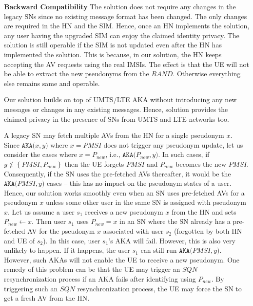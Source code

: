 \documentclass{llncs} %
\begin{document}
\textbf{Backward Compatibility} The solution does not require any changes in the legacy SNs since no existing message format has been changed. The only changes are required in the HN and the SIM. Hence, once an HN implements the solution, any user having the upgraded SIM can enjoy the claimed identity privacy. The solution is still operable if the SIM is not updated even after the HN has implemented the solution. This is because, in our solution, the HN keeps accepting the AV requests using the real IMSIs. The effect is that the UE will not be able to extract the new pseudonyms from the $RAND$. Otherwise everything else remains same and operable. 

Our solution builds on top of UMTS/LTE AKA without introducing any new messages or changes in any existing messages. Hence, solution provides the claimed privacy in the presence of SNs from UMTS and LTE networks too. 


A legacy SN may fetch multiple AVs from the HN for a single pseudonym $x$. Since $\texttt{AKA($x,y$)}$ where $x= PMSI$ does not trigger any pseudonym update, let us consider the cases where $x=P_{new}$, i.e.,
$\texttt{AKA($P_{new},y$)}$. In such cases, if $y \notin  \left\lbrace PMSI,P_{new} \right\rbrace$ then the UE forgets $PMSI$ and $P_{new}$ becomes the new $PMSI$. Consequently, if the SN uses the pre-fetched AVs thereafter, it would be the $\texttt{AKA($PMSI,y$)}$ cases -- this has no impact on the pseudonym states of a user. Hence, our solution works smoothly even when an SN uses pre-fetched AVs for a pseudonym $x$ unless some other user in the same SN is assigned with pseudonym $x$. Let us assume a user $s_1$ receives a new pseudonym $x$ from the HN and sets $P_{new} \leftarrow x$. Then user $s_1$ uses $P_{new}=x$ in an SN where the SN already has a pre-fetched AV for the pseudonym $x$ associated with user $s_2$ (forgotten by both HN and UE of $s_2$). In this case, user $s_1$'s AKA will fail. However, this is also very unlikely to happen. If it happens, the user $s_1$ can still run $\texttt{AKA($PMSI,y$)}$. However, such AKAs will not enable the UE to receive a new pseudonym. One remedy of this problem can be that the UE may trigger an $SQN$ resynchronization process if an AKA fails after identifying using $P_{new}$. By triggering such an $SQN$ resynchronization process, the UE may force the SN to get a fresh AV from the HN.
\end{document}
